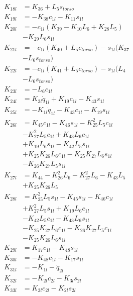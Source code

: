 \begin{multicols}{2}
\begin{align}
K_{18l} &= K_{36} + L_5s_{torso} \nonumber \\
K_{19l} &= - K_{38}c_{1l} - K_{11}s_{1l} \nonumber \\
K_{20l} &= - c_{1l}(K_{39} - K_{10}L_6 + K_{28}L_5)  \nonumber \\
&- K_{29}L_6s_{1l} \nonumber \\
K_{21l} &= - c_{1l}(K_{40} + L_5c_{torso}) - s_{1l}(K_{37}  \nonumber \\
&- L_6s_{torso}) \nonumber \\
K_{22l} &= - c_{1l}(K_{41} + L_5c_{torso}) - s_{1l}(L_4  \nonumber \\
&- L_6s_{torso}) \nonumber \\
K_{23l} &= -L_6c_{1l} \nonumber \\
K_{24l} &= K_{3l}\dot{q}_{1l} + K_{19}c_{1l} - K_{43}s_{1l} \nonumber \\
K_{25l} &= - K_{1l}\dot{q}_{1l} - K_{43}c_{1l} - K_{19}s_{1l} \nonumber \\
K_{26l} &= K_{45}c_{1l} - K_{46}s_{1l} - K_{25}^2L_5c_{1l}  \nonumber \\
&- K_{27}^2L_5c_{1l} + K_{43}L_6c_{1l}  \nonumber \\
&+ K_{19}L_6s_{1l} - K_{42}L_5s_{1l}  \nonumber \\
&+ K_{25}K_{26}L_6c_{1l} - K_{25}K_{27}L_6s_{1l}  \nonumber \\
&- K_{26}K_{27}L_5s_{1l} \nonumber \\
K_{27l} &= K_{44} - K_{26}^2L_6 - K_{27}^2L_6 - K_{43}L_5  \nonumber \\
&+ K_{25}K_{26}L_5 \nonumber \\
K_{28l} &= K_{25}^2L_5s_{1l} - K_{45}s_{1l} - K_{46}c_{1l}  \nonumber \\
&+ K_{27}^2L_5s_{1l} + K_{19}L_6c_{1l}  \nonumber \\
&- K_{42}L_5c_{1l} - K_{43}L_6s_{1l}  \nonumber \\
&- K_{25}K_{27}L_6c_{1l} - K_{26}K_{27}L_5c_{1l}  \nonumber \\
&- K_{25}K_{26}L_6s_{1l} \nonumber \\
K_{29l} &= K_{17}c_{1l} - K_{48}s_{1l} \nonumber \\
K_{30l} &= - K_{48}c_{1l} - K_{17}s_{1l} \nonumber \\
K_{31l} &= - K_{1l} - \dot{q}_{2l} \nonumber \\
K_{32l} &= - K_{2l}c_{2l} - K_{3l}s_{2l} \nonumber \\
K_{33l} &= K_{3l}c_{2l} - K_{2l}s_{2l} \nonumber \\

\end{align}
\end{multicols}
